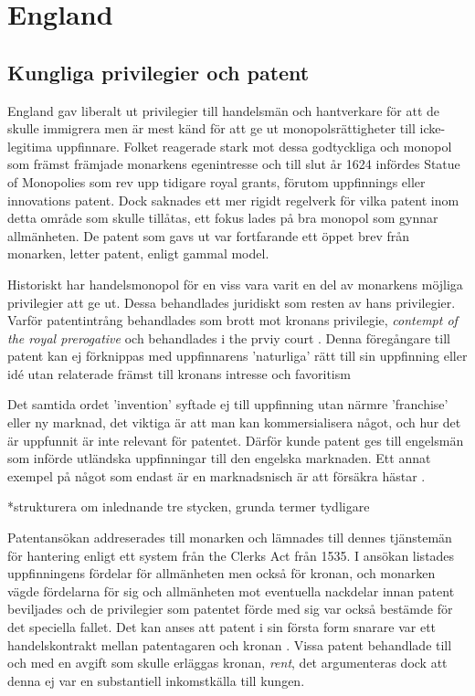 \section{England} 

\subsection{Kungliga privilegier och patent} 
\label{sub:kungliga_privilegier_och_patent}

England gav liberalt ut privilegier till handelsmän och hantverkare för att de skulle immigrera men är
mest känd för att ge ut monopolsrättigheter till icke-legitima uppfinnare. Folket reagerade stark mot
dessa godtyckliga och monopol som främst främjade monarkens egenintresse och till slut år 1624 infördes
Statue of Monopolies som rev upp tidigare royal grants, förutom uppfinnings eller innovations patent.
Dock saknades ett mer rigidt regelverk för vilka patent inom detta område som skulle tillåtas, ett fokus
lades på bra monopol som gynnar allmänheten. De patent som gavs ut var fortfarande ett öppet brev från
monarken, letter patent, enligt gammal model.

Historiskt har handelsmonopol för en viss vara 
varit en del av monarkens möjliga privilegier att ge ut. Dessa behandlades
juridiskt som resten av hans privilegier. Varför patentintrång
behandlades som brott mot kronans privilegie, \emph{contempt of the royal prerogative} och behandlades i the prviy court \cite{macleod}. Denna
föregångare till patent kan ej förknippas med uppfinnarens 'naturliga' rätt till sin uppfinning eller idé
utan relaterade främst till kronans intresse och favoritism \cite{bracha}

Det samtida ordet 'invention' syftade ej till uppfinning utan närmre 'franchise' eller ny marknad, det
viktiga är att man kan kommersialisera något, och hur det är uppfunnit är inte relevant för patentet\cite{bracha}.
Därför kunde patent ges till engelsmän som införde utländska uppfinningar till den engelska marknaden.
Ett annat exempel på något som endast är en marknadsnisch är att försäkra hästar \cite{davies}.


*strukturera om inlednande tre stycken, grunda termer tydligare

Patentansökan addreserades till monarken och lämnades till dennes tjänstemän för hantering enligt ett
system från the Clerks Act från 1535\cite{bracha}. I ansökan listades uppfinningens fördelar för allmänheten men också
för kronan, och monarken vägde fördelarna för sig och allmänheten mot eventuella nackdelar innan patent
beviljades och de privilegier som patentet förde med sig var också bestämde för det speciella fallet. Det
kan anses att patent i sin första form snarare var ett handelskontrakt mellan patentagaren och kronan
\cite{bracha}. Vissa patent behandlade till och med en avgift som skulle erläggas kronan, \emph{rent},
det argumenteras dock att denna ej var en substantiell inkomstkälla till kungen. \cite{macleod2}


